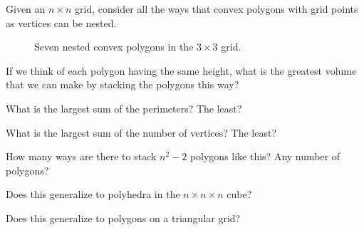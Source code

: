 \documentclass{article}
\begin{document}
Given an $n \times n$ grid, consider all the ways that convex polygons
with grid points as vertices can be nested.
\begin{figure}[!h]
  \centering
  \caption{Seven nested convex polygons in the $3 \times 3$ grid.}
\end{figure}

\begin{question}
  If we think of each polygon having the same height, what is the greatest
  volume that we can make by stacking the polygons this way?
\end{question}

\begin{related}
  \item What is the largest sum of the perimeters? The least?
  \item What is the largest sum of the number of vertices? The least?
  \item How many ways are there to stack $n^2 - 2$ polygons like this?
    Any number of polygons?
  \item Does this generalize to polyhedra in the $n \times n \times n$ cube?
  \item Does this generalize to polygons on a triangular grid?
\end{related}
\end{document}
